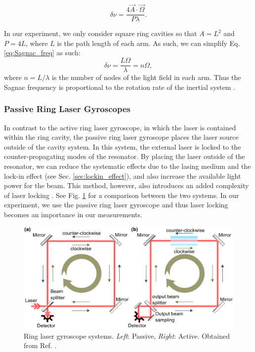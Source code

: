 \documentclass[a4paper]{report}
\numberwithin{equation}{section}
\begin{document}
\begin{equation}
	\delta \nu = \frac{4 \vec{A} \cdot \vec{\Omega}}{P \lambda}.
	\label{eq:Sagnac_freq}
\end{equation}

In our experiment, we only consider square ring cavities so that $A = L^2$ and $P = 4L$, where $L$ is the path length of each arm. 
As such, we can simplify Eq. \ref{eq:Sagnac_freq} as such: 
\begin{equation}
	\delta \nu  = \frac{L \Omega}{\lambda} = n \Omega,
	\label{eq:Sagnac_scale}
\end{equation}
where $n = L / \lambda$ is the number of nodes of the light field in each arm. Thus the Sagnac frequency is proportional to the rotation rate
of the inertial system \cite{Groh2021}.\par 

\subsubsection{Passive Ring Laser Gyroscopes}

In contrast to the active ring laser gyroscope, in which the laser is contained within the ring cavity, the passive ring laser
gyroscope places the laser source outside of the cavity system. In this system, the external laser is locked to the counter-propagating
modes of the resonator. By placing the laser outside of the resonator, we can reduce the systematic effects due to the lasing medium and 
the lock-in effect (see Sec. \ref{sec:lockin_effect}), and also increase the available light power for the beam. 
This method, however, also introduces an added complexity of laser locking \cite{Groh2021}. See Fig. \ref{fig:passive_active} for a comparison between the two
systems. In our experiment, we use the passive ring laser gyroscope and thus laser locking becomes an importance in our measurements.

\begin{figure}[h!]
	\centering
	\includegraphics[width=0.6\columnwidth]{passive_active_gyroscope.png}
	\caption{Ring laser gyroscope systems. \textit{Left}: Passive, \textit{Right}: Active. Obtained from Ref. \cite{Kudelin2021}.}
	\label{fig:passive_active}
\end{figure}
\end{document}
